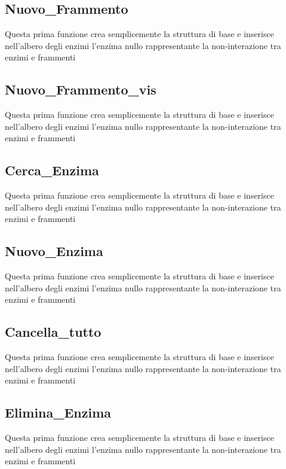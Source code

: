 \documentclass[a4paper,10pt]{article}
\begin{document}
\subsection{Nuovo\_{}Frammento}
Questa prima funzione crea semplicemente la struttura di base e inserisce nell'albero degli enzimi l'enzima nullo rappresentante la non-interazione tra enzimi e frammenti
\begin{algorithm}[H]
\end{algorithm}
\subsection{Nuovo\_{}Frammento\_{}vis}
Questa prima funzione crea semplicemente la struttura di base e inserisce nell'albero degli enzimi l'enzima nullo rappresentante la non-interazione tra enzimi e frammenti
\begin{algorithm}[H]
\end{algorithm}
\subsection{Cerca\_{}Enzima}
Questa prima funzione crea semplicemente la struttura di base e inserisce nell'albero degli enzimi l'enzima nullo rappresentante la non-interazione tra enzimi e frammenti
\begin{algorithm}[H]
\end{algorithm}
\subsection{Nuovo\_{}Enzima}
Questa prima funzione crea semplicemente la struttura di base e inserisce nell'albero degli enzimi l'enzima nullo rappresentante la non-interazione tra enzimi e frammenti
\begin{algorithm}[H]
\end{algorithm}
\subsection{Cancella\_{}tutto}
Questa prima funzione crea semplicemente la struttura di base e inserisce nell'albero degli enzimi l'enzima nullo rappresentante la non-interazione tra enzimi e frammenti
\begin{algorithm}[H]
\end{algorithm}
\subsection{Elimina\_{}Enzima}
Questa prima funzione crea semplicemente la struttura di base e inserisce nell'albero degli enzimi l'enzima nullo rappresentante la non-interazione tra enzimi e frammenti
\begin{algorithm}[H]
\end{algorithm}
\end{document}
